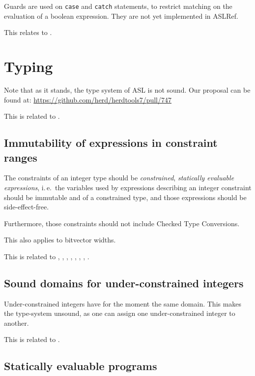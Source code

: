 \documentclass{book}
\begin{document}
Guards are used on \texttt{case} and \texttt{catch} statements, to restrict
matching on the evaluation of a boolean expression.
%
They are not yet implemented in ASLRef.

This relates to .

\section{Typing}

Note that as it stands, the type system of ASL is not sound.
Our proposal can be found at: 
\url{https://github.com/herd/herdtools7/pull/747}

This is related to .

\subsection{Immutability of expressions in constraint ranges}

The constraints of an integer type should be \emph{constrained},
\emph{statically evaluable expressions}, i.\,e.\ the variables used by
expressions describing an integer constraint should be immutable and of a
constrained type, and those expressions should be side-effect-free.

Furthermore, those constraints should not include Checked Type Conversions.

This also applies to bitvector widths.

This is related to , , , ,
, , , .

\subsection{Sound domains for under-constrained integers}

Under-constrained integers have for the moment the same domain.
%
This makes the type-system unsound, as one can assign one under-constrained
integer to another.
%

This is related to .

\subsection{Statically evaluable programs}%
\label{sec:nyi:statically-evaluable-subprograms}
\end{document}
